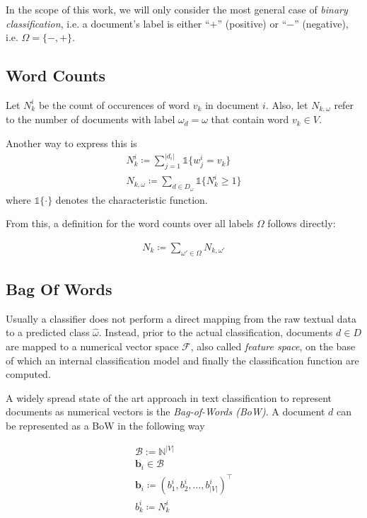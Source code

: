 In the scope of this work, we will only consider the most general case of
\emph{binary classification}, i.e. a document's label is either ``$+$'' (positive) or
``$-$'' (negative), i.e.  $\Omega = \{-,+\}$. 
 
 \subsection{Word Counts}
 
Let $N_k^i$ be the count of occurences of word $v_k$ in document $i$. Also, let
$N_{k,\omega}$ refer to the number of documents with label $\omega_d = \omega$ 
that contain word $v_k \in V$.

Another way to express this is
\begin{eqnarray*}
 N_k^i \coloneqq \sum\limits_{j=1}^{|d_i|} \mathbb{1}\{w_j^i = v_k\} \\
 N_{k,\omega} \coloneqq \sum\limits_{d \in D_\omega} \mathbb{1}\{N^i_k \geq 1\} 
\end{eqnarray*}
where $\mathbb{1}\{\cdot\}$ denotes the characteristic function.

From this, a definition for the word counts over all labels $\Omega$ follows
directly:

\begin{eqnarray*}
N_k \coloneqq \sum_{\omega'\in \Omega} N_{k,\omega'} 
\end{eqnarray*}

\subsection{Bag Of Words}

Usually a classifier does not perform a direct mapping from
the raw textual data to a predicted class $\hat{\omega}$. Instead, prior to the actual
classification, documents $d \in D$ are mapped to a numerical vector
space $\mathcal{F}$, also called \emph{feature space}, on the base of which an internal 
classification model and finally the classification function are computed.

A widely spread state of the art approach in text classification to represent
documents as numerical vectors is the \emph{Bag-of-Words (BoW)}.
A document $d$ can be represented as a BoW in the following way

\begin{eqnarray*}
	\mathcal{B} := \mathbb{N}^{|V|} \\
	\mathbf{b}_i \in \mathcal{B} \\
	\mathbf{b}_i \coloneqq (b_1^i, b_2^i, \ldots, b_{|V|}^i)^\intercal \\
	b_k^i \coloneqq N_k^i
\end{eqnarray*}
	
